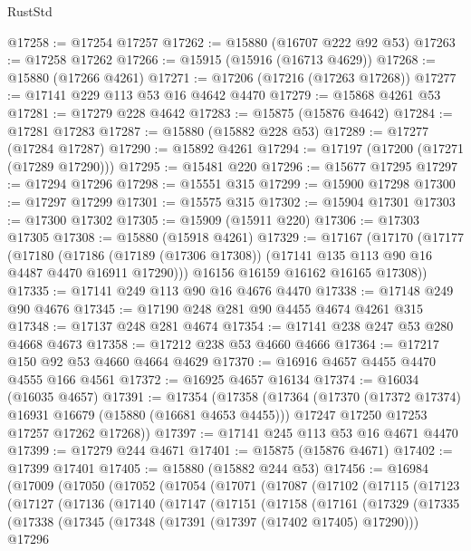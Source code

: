 \begin{lexlean}{RustStd}
\begin{coremodule}
@17258 := @17254 @17257
@17262 := @15880 (@16707 @222 @92 @53)
@17263 := @17258 @17262
@17266 := @15915 (@15916 (@16713 @4629))
@17268 := @15880 (@17266 @4261)
@17271 := @17206 (@17216 (@17263 @17268))
@17277 := @17141 @229 @113 @53 @16 @4642 @4470
@17279 := @15868 @4261 @53
@17281 := @17279 @228 @4642
@17283 := @15875 (@15876 @4642)
@17284 := @17281 @17283
@17287 := @15880 (@15882 @228 @53)
@17289 := @17277 (@17284 @17287)
@17290 := @15892 @4261
@17294 := @17197 (@17200 (@17271 (@17289 @17290)))
@17295 := @15481 @220
@17296 := @15677 @17295
@17297 := @17294 @17296
@17298 := @15551 @315
@17299 := @15900 @17298
@17300 := @17297 @17299
@17301 := @15575 @315
@17302 := @15904 @17301
@17303 := @17300 @17302
@17305 := @15909 (@15911 @220)
@17306 := @17303 @17305
@17308 := @15880 (@15918 @4261)
@17329 := @17167
    (@17170
      (@17177
        (@17180
          (@17186 (@17189 (@17306 @17308)) (@17141 @135 @113 @90 @16 @4487 @4470 @16911 @17290)))
        @16156
        @16159
        @16162
        @16165
        @17308))
@17335 := @17141 @249 @113 @90 @16 @4676 @4470
@17338 := @17148 @249 @90 @4676
@17345 := @17190 @248 @281 @90 @4455 @4674 @4261 @315
@17348 := @17137 @248 @281 @4674
@17354 := @17141 @238 @247 @53 @280 @4668 @4673
@17358 := @17212 @238 @53 @4660 @4666
@17364 := @17217 @150 @92 @53 @4660 @4664 @4629
@17370 := @16916 @4657 @4455 @4470 @4555 @166 @4561
@17372 := @16925 @4657 @16134
@17374 := @16034 (@16035 @4657)
@17391 := @17354
    (@17358
      (@17364
        (@17370 (@17372 @17374) @16931 @16679 (@15880 (@16681 @4653 @4455)))
        @17247
        @17250
        @17253
        @17257
        @17262
        @17268))
@17397 := @17141 @245 @113 @53 @16 @4671 @4470
@17399 := @17279 @244 @4671
@17401 := @15875 (@15876 @4671)
@17402 := @17399 @17401
@17405 := @15880 (@15882 @244 @53)
@17456 := @16984
    (@17009
      (@17050
        (@17052
          (@17054
            (@17071
              (@17087
                (@17102
                  (@17115
                    (@17123
                      (@17127
                        (@17136
                          (@17140
                            (@17147
                              (@17151
                                (@17158
                                  (@17161
                                    (@17329
                                      (@17335
                                        (@17338
                                          (@17345
                                            (@17348 (@17391 (@17397 (@17402 @17405) @17290)))
                                            @17296

\end{coremodule}
\end{lexlean}
